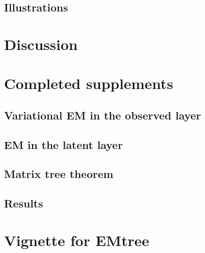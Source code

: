 \subsection{Illustrations}  \label{sec:illustration}

\section{Discussion} 
\begin{subappendices}
\section{Completed supplements}
\subsection{Variational EM in the observed layer} \label{app:VEM} 
\subsection{EM in the latent layer} \label{app:EM} 
\subsection{Matrix tree theorem}\label{app:MTT} 
\subsection{Results}\label{app:results} 
\newpage
\section{Vignette for EMtree}
\end{subappendices}

